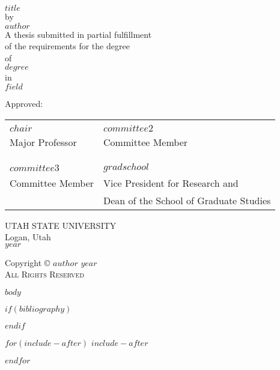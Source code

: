 \documentclass{DissertateUSU}
\renewcommand{\maketitle}{
	\thispagestyle{empty}
	\vspace*{\fill}
	\begin{center}
	\doublespaced
	\MakeUppercase{$title$}\\
	by\\
	$author$ \\
	\singlespaced
	A dissertation submitted in partial fulfillment\\
	of the requirements for the degree \\
	\doublespaced
	of\\
	\MakeUppercase{$degree$} \\
	in\\
	\singlespaced
  $field$ \\
	\end{center}

	\vspace{20pt}
	\noindent Approved: \\
	\vspace{30pt}
	\noindent
	\begin{tabular}{ll}
    \makebox[2.75in]{\hrulefill} & \makebox[2.75in]{\hrulefill}\\
    $chair$                      & $committee2$ \\
    Major Professor              & Committee Member \\
    & \\
    & \\
    \makebox[2.75in]{\hrulefill} & \makebox[2.75in]{\hrulefill}\\
    $committee3$                 & $committee4$ \\
    Committee Member             & Committee Member \\
    & \\
    & \\
    \makebox[2.75in]{\hrulefill} & \makebox[2.75in]{\hrulefill}\\
    $committee5$                 & $gradschool$ \\
    Committee Member             & Vice President for Research and \\
                                 & Dean of the School of Graduate Studies \\
    \end{tabular}

  \vspace{20pt}
    \begin{center}
	  \singlespacing
      $uni$\\
	    Logan, Utah\\
	    \doublespacing
	    $year$
	  \end{center}
	\vspace*{\fill}
	\clearpage
}
\renewcommand{\maketitle}{
	\thispagestyle{empty}
	\vspace*{\fill}
	\begin{center}
	\doublespaced
	\MakeUppercase{$title$}\\
	by\\
	$author$ \\
	\singlespaced
	A thesis submitted in partial fulfillment\\
	of the requirements for the degree \\
	\doublespaced
	of\\
	\MakeUppercase{$degree$} \\
	in\\
	\singlespaced
  $field$ \\
	\end{center}

	\vspace{20pt}
	\noindent Approved: \\
	\vspace{30pt}
	\noindent
	\begin{tabular}{ll}
    \makebox[2.75in]{\hrulefill} & \makebox[2.75in]{\hrulefill}\\
    $chair$                      & $committee2$ \\
    Major Professor              & Committee Member \\
    & \\
    & \\
    \makebox[2.75in]{\hrulefill} & \makebox[2.75in]{\hrulefill}\\
    $committee3$                 & $gradschool$ \\
    Committee Member             & Vice President for Research and \\
                                 & Dean of the School of Graduate Studies \\

    \end{tabular}

  \vspace{20pt}
    \begin{center}
	  \singlespacing
      UTAH STATE UNIVERSITY\\
	    Logan, Utah\\
	    \doublespacing
	    $year$
	  \end{center}
	\vspace*{\fill}
	\clearpage
}
\newcommand{\copyrightpage}{
	\vspace*{\fill}
  \begin{center}
	\doublespacing
	Copyright \hspace{3pt}
	  \scshape \small \copyright  \hspace{3pt}
	  $author$ \hspace{3pt} $year$ \\
	All Rights Reserved
  \end{center}
	\vspace*{\fill}
}
\begin{document}
\maketitle

\pagestyle{empty}
\copyrightpage


$body$

$if(bibliography)$

$endif$

$for(include-after)$
$include-after$

$endfor$
\end{document}
